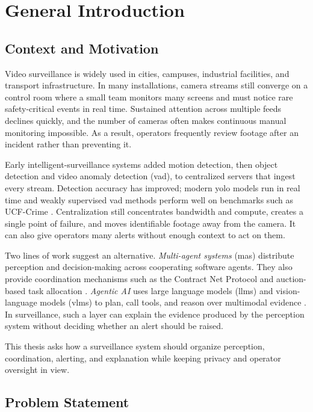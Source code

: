 \chapter{General Introduction}
\label{chap:introduction}

\section{Context and Motivation}

Video surveillance is widely used in cities, campuses, industrial facilities, and transport infrastructure. In many installations, camera streams still converge on a control room where a small team monitors many screens and must notice rare safety-critical events in real time. Sustained attention across multiple feeds declines quickly, and the number of cameras often makes continuous manual monitoring impossible. As a result, operators frequently review footage after an incident rather than preventing it.

Early intelligent-surveillance systems added motion detection, then object detection and video anomaly detection (\gls{vad}), to centralized servers that ingest every stream. Detection accuracy has improved; modern \gls{yolo} models run in real time and weakly supervised \gls{vad} methods perform well on benchmarks such as UCF-Crime \cite{sultani2018ucfcrime}. Centralization still concentrates bandwidth and compute, creates a single point of failure, and moves identifiable footage away from the camera. It can also give operators many alerts without enough context to act on them.

Two lines of work suggest an alternative. \emph{Multi-agent systems} (\gls{mas}) distribute perception and decision-making across cooperating software agents. They also provide coordination mechanisms such as the Contract Net Protocol \cite{smith1980contract} and auction-based task allocation \cite{parker2002alliance}. \emph{Agentic AI} uses large language models (\gls{llm}s) and vision-language models (\gls{vlm}s) to plan, call tools, and reason over multimodal evidence \cite{sapkota2025ai, yao2023react}. In surveillance, such a layer can explain the evidence produced by the perception system without deciding whether an alert should be raised.

This thesis asks how a surveillance system should organize perception, coordination, alerting, and explanation while keeping privacy and operator oversight in view.

\section{Problem Statement}

